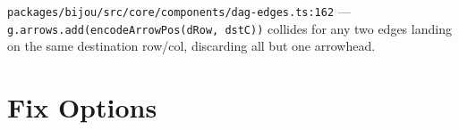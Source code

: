 \begin{itemize}
  \texttt{p\allowbreak{}a\allowbreak{}c\allowbreak{}k\allowbreak{}a\allowbreak{}g\allowbreak{}e\allowbreak{}s\allowbreak{}/\allowbreak{}b\allowbreak{}i\allowbreak{}j\allowbreak{}o\allowbreak{}u\allowbreak{}/\allowbreak{}s\allowbreak{}r\allowbreak{}c\allowbreak{}/\allowbreak{}c\allowbreak{}o\allowbreak{}r\allowbreak{}e\allowbreak{}/\allowbreak{}c\allowbreak{}o\allowbreak{}m\allowbreak{}p\allowbreak{}o\allowbreak{}n\allowbreak{}e\allowbreak{}n\allowbreak{}t\allowbreak{}s\allowbreak{}/\allowbreak{}d\allowbreak{}a\allowbreak{}g\allowbreak{}-\allowbreak{}e\allowbreak{}d\allowbreak{}g\allowbreak{}e\allowbreak{}s\allowbreak{}.\allowbreak{}t\allowbreak{}s\allowbreak{}:\allowbreak{}1\allowbreak{}6\allowbreak{}2} --- \texttt{g\allowbreak{}.\allowbreak{}a\allowbreak{}r\allowbreak{}r\allowbreak{}o\allowbreak{}w\allowbreak{}s\allowbreak{}.\allowbreak{}a\allowbreak{}d\allowbreak{}d\allowbreak{}(\allowbreak{}e\allowbreak{}n\allowbreak{}c\allowbreak{}o\allowbreak{}d\allowbreak{}e\allowbreak{}A\allowbreak{}r\allowbreak{}r\allowbreak{}o\allowbreak{}w\allowbreak{}P\allowbreak{}o\allowbreak{}s\allowbreak{}(\allowbreak{}d\allowbreak{}R\allowbreak{}o\allowbreak{}w\allowbreak{},\allowbreak{} \allowbreak{}d\allowbreak{}s\allowbreak{}t\allowbreak{}C\allowbreak{})\allowbreak{})} collides for any two edges landing on the same destination row/col, discarding all but one arrowhead.
\end{itemize}

\section{Fix Options}\label{record-289-fix-options}

